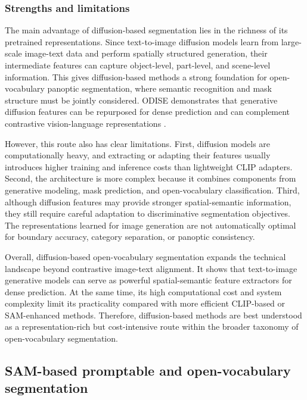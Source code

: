 \subsubsection{Strengths and limitations}

The main advantage of diffusion-based segmentation lies in the richness of its pretrained representations. 
Since text-to-image diffusion models learn from large-scale image-text data and perform spatially structured generation, their intermediate features can capture object-level, part-level, and scene-level information. 
This gives diffusion-based methods a strong foundation for open-vocabulary panoptic segmentation, where semantic recognition and mask structure must be jointly considered. 
ODISE demonstrates that generative diffusion features can be repurposed for dense prediction and can complement contrastive vision-language representations \cite{Xu2023a}.

However, this route also has clear limitations. 
First, diffusion models are computationally heavy, and extracting or adapting their features usually introduces higher training and inference costs than lightweight CLIP adapters. 
Second, the architecture is more complex because it combines components from generative modeling, mask prediction, and open-vocabulary classification. 
Third, although diffusion features may provide stronger spatial-semantic information, they still require careful adaptation to discriminative segmentation objectives. 
The representations learned for image generation are not automatically optimal for boundary accuracy, category separation, or panoptic consistency.

Overall, diffusion-based open-vocabulary segmentation expands the technical landscape beyond contrastive image-text alignment. 
It shows that text-to-image generative models can serve as powerful spatial-semantic feature extractors for dense prediction. 
At the same time, its high computational cost and system complexity limit its practicality compared with more efficient CLIP-based or SAM-enhanced methods. 
Therefore, diffusion-based methods are best understood as a representation-rich but cost-intensive route within the broader taxonomy of open-vocabulary segmentation.

\subsection{SAM-based promptable and open-vocabulary segmentation}
\label{subsec:sam_based_segmentation}

